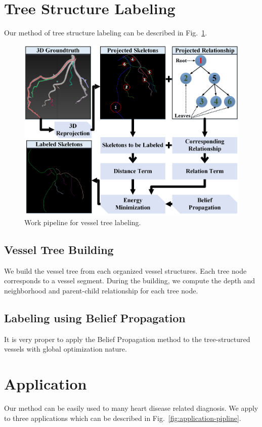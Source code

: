 \documentclass[journal]{IEEEtran}
\begin{document}
\section{Tree Structure Labeling}
\label{sec:tree-labeling}
Our method of tree structure labeling can be described in Fig.~\ref{fig:tree-labeling}.

\begin{figure}[!t]
\centering
\includegraphics[width=1.0\linewidth]{./images/labeling-pipeline.png}
\caption{Work pipeline for vessel tree labeling.}
\label{fig:tree-labeling}
\end{figure}

\subsection{Vessel Tree Building}
We build the vessel tree from each organized vessel structures. Each tree node corresponds to a vessel segment. During the building, we compute the depth and neighborhood and parent-child relationship for each tree node.
\subsection{Labeling using Belief Propagation}
It is very proper to apply the Belief Propagation method to the tree-structured vessels with global optimization nature.

\section{Application}
Our method can be easily used to many heart disease related diagnosis. We apply to three applications which can be described in Fig.~\ref{fig:application-pipline}.
\end{document}
